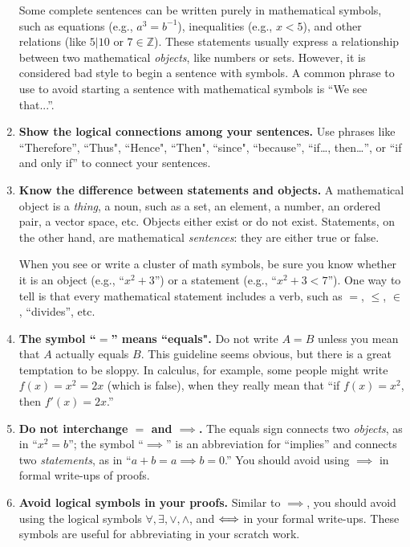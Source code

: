 \begin{enumerate}
Some complete sentences can be written purely in mathematical symbols, such as equations (e.g., $a^3=b^{-1}$), inequalities (e.g., $x<5$), and other relations (like $5\big|10$ or $7\in\mathbb{Z}$). These statements usually express a relationship between two mathematical \emph{objects}, like numbers or sets.  However, it is considered bad style to begin a sentence with symbols.  A common phrase to use to avoid starting a sentence with mathematical symbols is ``We see that...''.

\item \textbf{Show the logical connections among your sentences.}
Use phrases like ``Therefore'', ``Thus", ``Hence", ``Then", ``since", ``because'', ``if\ldots, then\ldots'', or ``if and only if'' to connect your sentences.
  
\item \textbf{Know the difference between statements and objects.}
A mathematical object is a \emph{thing}, a noun, such as a set, an element, a number, an ordered pair, a vector space, etc. Objects either exist or do not exist. Statements, on the other hand, are mathematical \emph{sentences}:  they are either true or false.
        
When you see or write a cluster of math symbols, be sure you know whether it is an object (e.g., ``$x^2+3$'') or a statement (e.g., ``$x^2+3<7$''). One way to tell is that every mathematical statement includes a verb, such as $=$, $\leq$, $\in$, ``divides'', etc.
        
\item \textbf{The symbol ``$=$'' means ``equals".}
Do not write $A=B$ unless you mean that $A$ actually equals $B$. This guideline seems obvious, but there is a great temptation to be sloppy.  In calculus, for example, some people might write $f(x)=x^{2}=2x$ (which is false), when they really mean that ``if $f(x)=x^{2}$, then $f'(x)=2x$.''

\item \textbf{Do not interchange ${=}$ and ${\implies}$.}
The equals sign connects two \emph{objects}, as in ``$x^2=b$''; the symbol ``$\implies$'' is an abbreviation for ``implies'' and connects two \emph{statements}, as in ``$a+b=a \implies b=0$.''  You should avoid using $\implies$ in formal write-ups of proofs.

\item \textbf{Avoid logical symbols in your proofs.}  
Similar to $\implies$, you should avoid using the logical symbols $\forall, \exists, \vee, \wedge$, and $\Longleftrightarrow$ in your formal write-ups.  These symbols are useful for abbreviating in your scratch work. 


\end{enumerate}
